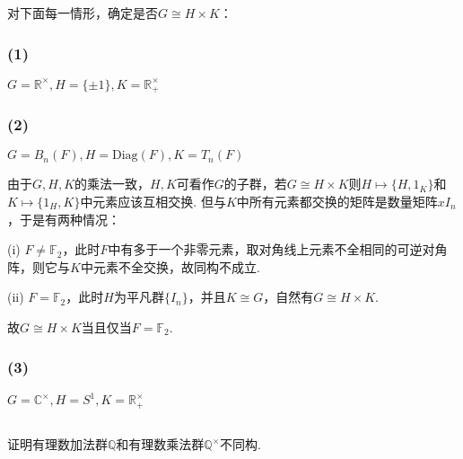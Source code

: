 \Proofbyintimidation

\subsection{}
对下面每一情形，确定是否$G\cong H\times K$：
\subsubsection{(1)}
$G=\mathbb{R}^{\times}, H=\{\pm1\}, K=\mathbb{R}^{\times}_+$

\subsubsection{(2)}
$G=B_n(F), H=\mathrm{Diag}(F), K=T_n(F)$

\jie
由于$G,H,K$的乘法一致，$H,K$可看作$G$的子群，若$G\cong H\times K$则$H\mapsto \{H, 1_K\}$和$K\mapsto \{1_H, K\}$中元素应该互相交换. 但与$K$中所有元素都交换的矩阵是数量矩阵$xI_n$，于是有两种情况：

(i) $F\neq\mathbb{F}_2$，此时$F$中有多于一个非零元素，取对角线上元素不全相同的可逆对角阵，则它与$K$中元素不全交换，故同构不成立.

(ii) $F=\mathbb{F}_2$，此时$H$为平凡群$\{I_n\}$，并且$K\cong G$，自然有$G\cong H\times K$.

故$G\cong H\times K$当且仅当$F=\mathbb{F}_2$.
\subsubsection{(3)}
$G=\mathbb{C}^{\times}, H=S^1, K=\mathbb{R}^{\times}_+$


\subsection{}
证明有理数加法群$\mathbb{Q}$和有理数乘法群$\mathbb{Q}^{\times}$不同构.



